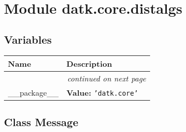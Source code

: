 %
%
%


\section{Module datk.core.distalgs}

    \label{datk:core:distalgs}


  \subsection{Variables}

    \vspace{-1cm}
\hspace{\varindent}\begin{longtable}{|p{\varnamewidth}|p{\vardescrwidth}|l}
\cline{1-2}
\cline{1-2} \centering \textbf{Name} & \centering \textbf{Description}& \\
\cline{1-2}
\endhead\cline{1-2}\multicolumn{3}{r}{\small\textit{continued on next page}}\\\endfoot\cline{1-2}
\endlastfoot\raggedright \_\-\_\-p\-a\-c\-k\-a\-g\-e\-\_\-\_\- & \raggedright \textbf{Value:} 
{\tt \texttt{'}\texttt{datk.core}\texttt{'}}&\\
\cline{1-2}
\end{longtable}



\subsection{Class Message}

